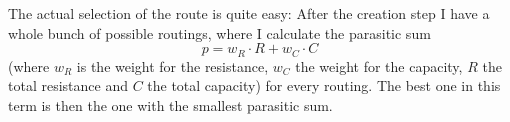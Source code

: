 The actual selection of the route is quite easy: After the creation step I have a whole bunch of possible routings, where I calculate the parasitic sum
\[p = w_R \cdot R + w_C \cdot C\]
(where $w_R$ is the weight for the resistance, $w_C$ the weight for the capacity, $R$ the total resistance and $C$ the total capacity) for every routing. The best one in this term is then the one with the smallest parasitic sum.